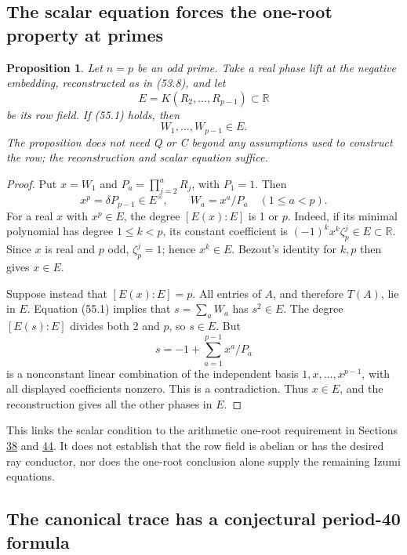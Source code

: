 \documentclass[11pt,reqno]{amsart}
\theoremstyle{plain}
\newtheorem{proposition}[theorem]{Proposition}
\begin{document}
\subsection{The scalar equation forces the one-root property at primes}\label{sec:55.2}

\begin{proposition}
Let \(n=p\) be an odd prime. Take a real phase lift
at the negative embedding, reconstructed as in (53.8), and let
\[
 E=K(R_2,\ldots,R_{p-1})\subset\mathbb R
\]
be its row field. If (55.1) holds, then
\begin{equation*}
 \boxed{W_1,\ldots,W_{p-1}\in E.}\tag{55.4}
\end{equation*}
The proposition does not need Q or C beyond any assumptions used to
construct the row; the reconstruction and scalar equation suffice.
\end{proposition}

\begin{proof}
Put \(x=W_1\) and
\(P_a=\prod_{j=2}^aR_j\), with \(P_1=1\). Then
\[
 x^p=\delta P_{p-1}\in E^\times,
 \qquad W_a=x^a/P_a\quad(1\le a<p).
\]
For a real \(x\) with \(x^p\in E\), the degree \([E(x):E]\) is
1 or \(p\). Indeed, if its minimal polynomial has degree
\(1\le k<p\), its constant coefficient is
\((-1)^k x^k\zeta_p^j\in E\subset\mathbb R\). Since \(x\) is real
and \(p\) odd, \(\zeta_p^j=1\); hence \(x^k\in E\).
Bezout's identity for \(k,p\) then gives \(x\in E\).

Suppose instead that \([E(x):E]=p\). All entries of \(A\), and
therefore \(T(A)\), lie in \(E\). Equation (55.1) implies that
\(s=\sum_aW_a\) has \(s^2\in E\). The degree \([E(s):E]\)
divides both 2 and \(p\), so \(s\in E\). But
\[
 s=-1+\sum_{a=1}^{p-1}x^a/P_a
\]
is a nonconstant linear combination of the independent basis
\(1,x,\ldots,x^{p-1}\), with all displayed coefficients nonzero.
This is a contradiction. Thus \(x\in E\), and the reconstruction
gives all the other phases in \(E\).
\end{proof}

This links the scalar condition to the arithmetic one-root requirement
in Sections \hyperref[sec:38]{38} and \hyperref[sec:44]{44}. It does not establish that the row field is
abelian or has the desired ray conductor, nor does the one-root
conclusion alone supply the remaining Izumi equations.

\subsection{The canonical trace has a conjectural period-40 formula}\label{sec:55.3}
\end{document}
